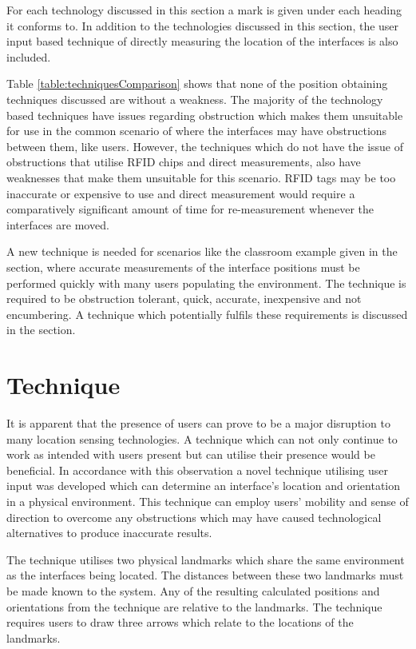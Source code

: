 \documentclass{bmcart}
\begin{document}
For each technology discussed in this section a mark is given under each heading it conforms to.
In addition to the technologies discussed in this section, the user input based technique of directly measuring the location of the interfaces is also included.

Table \ref{table:techniquesComparison} shows that none of the position obtaining techniques discussed are without a weakness.
The majority of the technology based techniques have issues regarding obstruction which makes them unsuitable for use in the common scenario of where the interfaces may have obstructions between them, like users.
However, the techniques which do not have the issue of obstructions that utilise RFID chips and direct measurements, also have weaknesses that make them unsuitable for this scenario.
RFID tags may be too inaccurate or expensive to use and direct measurement would require a comparatively significant amount of time for re-measurement whenever the interfaces are moved.

A new technique is needed for scenarios like the classroom example given in the  section, where accurate measurements of the interface positions must be performed quickly with many users populating the environment.
The technique is required to be obstruction tolerant, quick, accurate, inexpensive and not encumbering.
A technique  which potentially fulfils these requirements is discussed in the  section.


\section*{Technique}\label{sec:technique}

It is apparent that the presence of users can prove to be a major disruption to many location sensing technologies.
A technique which can not only continue to work as intended with users present but can utilise their presence would be beneficial.
In accordance with this observation a novel technique utilising user input was developed which can determine an interface's location and orientation in a physical environment.
This technique can employ users' mobility and sense of direction to overcome any obstructions which may have caused technological alternatives to produce inaccurate results.

The technique utilises two physical landmarks which share the same environment as the interfaces being located.
The distances between these two landmarks must be made known to the system.
Any of the resulting calculated positions and orientations from the technique are relative to the landmarks.
The technique requires users to draw three arrows which relate to the locations of the landmarks.
\end{document}
